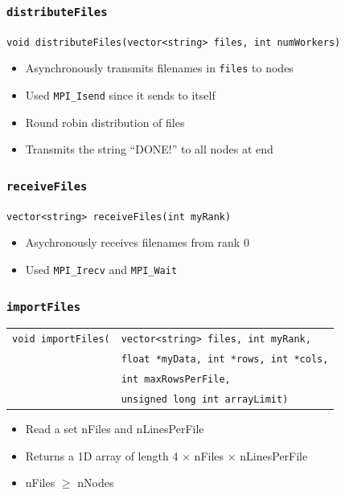 \documentclass[usernames,dvipsnames]{beamer}
\begin{document}

\begin{frame}
	\frametitle{\texttt{distributeFiles}}
	
	\begin{block}{\texttt{void distributeFiles(vector<string> files, int numWorkers)}}
    		\begin{itemize}
    		    \item Asynchronously transmits filenames in \texttt{files} to nodes
    			\item Used \texttt{MPI\_Isend} since it sends to itself
    			\item Round robin distribution of files
    			\item Transmits the string ``DONE!'' to all nodes at end
    		\end{itemize}
	\end{block}
\end{frame}



\begin{frame}
	\frametitle{\texttt{receiveFiles}}
	
	\begin{block}{\texttt{vector<string> receiveFiles(int myRank)}}
    		\begin{itemize}
    			\item Asychronously receives filenames from rank 0
    			\item Used \texttt{MPI\_Irecv} and \texttt{MPI\_Wait}
    		\end{itemize}
	\end{block}
\end{frame}



\begin{frame}
	\frametitle{\texttt{importFiles}}
	
	\begin{block}{
	\begin{tabular}{l l}
    		\texttt{void importFiles(} & \texttt{vector<string> files, int myRank,} \\
	& \texttt{float *myData, int *rows, int *cols,} \\
	& \texttt{int maxRowsPerFile,} \\
	& \texttt{unsigned long int arrayLimit)} \\
	\end{tabular}
	}
    		\begin{itemize}
    			\item Read a set nFiles and nLinesPerFile
    			\item Returns a 1D array of length 4 $\times$ nFiles $\times$ nLinesPerFile
    			\item nFiles $\ge$ nNodes
    		\end{itemize}
    	\end{block}	
\end{frame}
\end{document}
